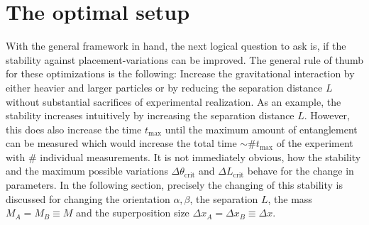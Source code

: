 \section{The optimal setup}\label{sec:4:optimal-setup}
With the general framework in hand, the next logical question to ask is, if the stability against placement-variations can be improved.
The general rule of thumb for these optimizations is the following:
Increase the gravitational interaction by either heavier and larger particles or by reducing the separation distance $L$ without substantial sacrifices of experimental realization.
As an example, the stability increases intuitively by increasing the separation distance $L$. However, this does also increase the time $t_\mathrm{max}$ until the maximum amount of entanglement can be measured which would increase the total time  $\sim \# t_\mathrm{max}$ of the experiment with $\#$ individual measurements.
It is not immediately obvious, how the stability and the maximum possible variations $\Delta \theta_\mathrm{crit}$ and $\Delta L_\mathrm{crit}$ behave for the change in parameters.
In the following section, precisely the changing of this stability is discussed for changing the orientation $\alpha, \beta$, the separation $L$, the mass $M_A = M_B \equiv M$ and the superposition size $\Delta x_A = \Delta x_B \equiv \Delta x$.


